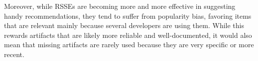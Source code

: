 
Moreover, while RSSEs are becoming more and more effective in suggesting handy recommendations, they tend to suffer from popularity bias, \ie favoring items that are relevant mainly because several developers are using them. While this rewards artifacts that  are likely more reliable and well-documented, it would also mean that missing artifacts are rarely used because they are very specific or more recent.







